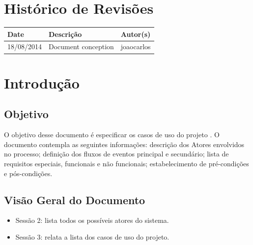 \documentclass{article}
\begin{document}

\capa
\newpage

\section*{\center Histórico de Revisões}
  \vspace*{1cm}
  \begin{table}[ht]
    \centering
    \begin{tabular}[pos]{|m{2cm} | m{7.2cm} | m{3.8cm}|} 
      \hline
      \cellcolor[gray]{0.9}
      \textbf{Date} & \cellcolor[gray]{0.9}\textbf{Descrição} & \cellcolor[gray]{0.9}\textbf{Autor(s)}\\ \hline
      \small 18/08/2014 & \small Document conception & \small joaocarlos \\ \hline      
    \end{tabular}
  \end{table}

\newpage

\tableofcontents
\newpage

\section{Introdução}

  \subsection{Objetivo}
  O objetivo desse documento é especificar os casos de uso do projeto \ipPROCESSProject. O documento contempla as seguintes informações: descrição dos Atores envolvidos no processo; definição dos fluxos de eventos principal e secundário; lista de requisitos especiais, funcionais e não funcionais; estabelecimento de pré-condições e pós-condições.

  \subsection{Visão Geral do Documento}
  \begin{itemize}
    \item Sessão 2: lista todos os possíveis atores do sistema.
    \item Sessão 3: relata a lista dos casos de uso do projeto.
  \end{itemize}
  
\end{document}
